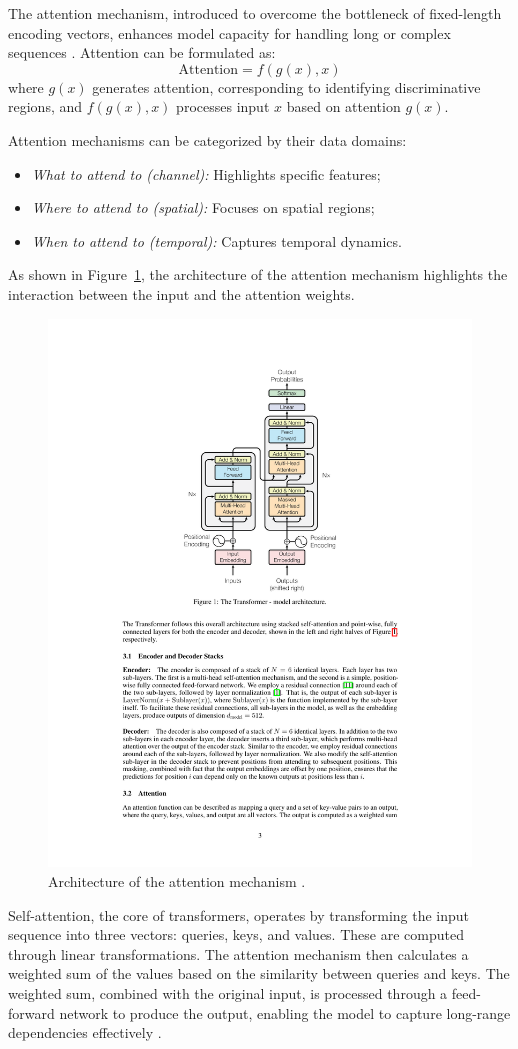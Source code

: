 The attention mechanism, introduced to overcome the bottleneck of fixed-length encoding vectors, enhances model capacity for handling long or complex sequences \cite{DBLP:journals/corr/VaswaniSPUJGKP17}. Attention can be formulated as:
\begin{equation}
    \text{Attention} = f(g(x), x)
\end{equation}
where \( g(x) \) generates attention, corresponding to identifying discriminative regions, and \( f(g(x), x) \) processes input \( x \) based on attention \( g(x) \).

Attention mechanisms can be categorized by their data domains:
\begin{itemize}
    \item \textit{What to attend to (channel):} Highlights specific features;
    \item \textit{Where to attend to (spatial):} Focuses on spatial regions;
    \item \textit{When to attend to (temporal):} Captures temporal dynamics.
\end{itemize}

As shown in Figure~\ref{fig:attention}, the architecture of the attention mechanism highlights the interaction between the input and the attention weights.
\begin{figure}[H]
    \centering
    \includegraphics[width=0.5\linewidth]{LateX/figs/attention_transformer_architecture.pdf}
    \caption{Architecture of the attention mechanism \cite{DBLP:journals/corr/VaswaniSPUJGKP17}.}
    \label{fig:attention}
\end{figure}

Self-attention, the core of transformers, operates by transforming the input sequence into three vectors: queries, keys, and values. These are computed through linear transformations. The attention mechanism then calculates a weighted sum of the values based on the similarity between queries and keys. The weighted sum, combined with the original input, is processed through a feed-forward network to produce the output, enabling the model to capture long-range dependencies effectively \cite{ramachandran2019standalone}.

